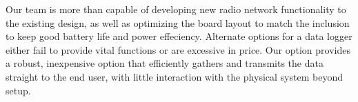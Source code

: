 \documentclass[12pt]{article}
\begin{document}
Our team is more than capable of developing new radio network functionality to the existing design, as well as optimizing the board layout to match the inclusion to keep good battery life and power effeciency.  Alternate options for a data logger either fail to provide vital functions or are excessive in price.  Our option provides a robust, inexpensive option that efficiently gathers and transmits the data straight to the end user, with little interaction with the physical system beyond setup.
\end{document}
